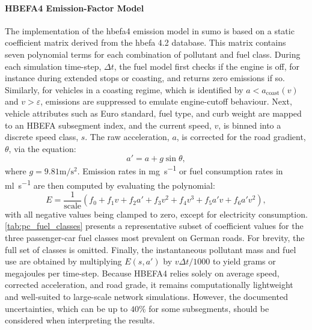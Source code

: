 \paragraph{HBEFA4 Emission-Factor Model}
The implementation of the \ac{hbefa}4 emission model in \ac{sumo} is based on a static coefficient matrix derived from the \ac{hbefa} 4.2 database. \cite{Krajzewicz2002} This matrix contains seven polynomial terms for each combination of pollutant and fuel class. During each simulation time-step, $\Delta t$, the fuel model first checks if the engine is off, for instance during extended stops or coasting, and returns zero emissions if so. Similarly, for vehicles in a coasting regime, which is identified by $a < a_{\mathrm{coast}}(v)$ and $v>\varepsilon$, emissions are suppressed to emulate engine-cutoff behaviour. Next, vehicle attributes such as Euro standard, fuel type, and curb weight are mapped to an HBEFA subsegment index, and the current speed, $v$, is binned into a discrete speed class, $s$. The raw acceleration, $a$, is corrected for the road gradient, $\theta$, via the equation:
\begin{equation}
    a' = a + g\sin\theta,
\end{equation}
where $g=9.81\unit{\metre\per\second\squared}$. Emission rates in \unit{\milli\gram\per\second} or fuel consumption rates in \unit{\milli\litre\per\second} are then computed by evaluating the polynomial:
\begin{equation}
    E =\frac{1}{\mathrm{scale}}\left(f_0 + f_1 v + f_2 a' + f_3 v^2 + f_4 v^3 + f_5 a'v + f_6 a'v^2\right),
\end{equation}
with all negative values being clamped to zero, except for electricity consumption. \vref{tab:pc_fuel_classes} presents a representative subset of coefficient values for the three passenger-car fuel classes most prevalent on German roads. For brevity, the full set of classes is omitted. Finally, the instantaneous pollutant mass and fuel use are obtained by multiplying $E(s,a')$ by $v\Delta t/1000$ to yield grams or megajoules per time-step. Because HBEFA4 relies solely on average speed, corrected acceleration, and road grade, it remains computationally lightweight and well-suited to large-scale network simulations. However, the documented uncertainties, which can be up to $40\%$ for some subsegments, should be considered when interpreting the results. \cite{SUMO_HBEFA4}

